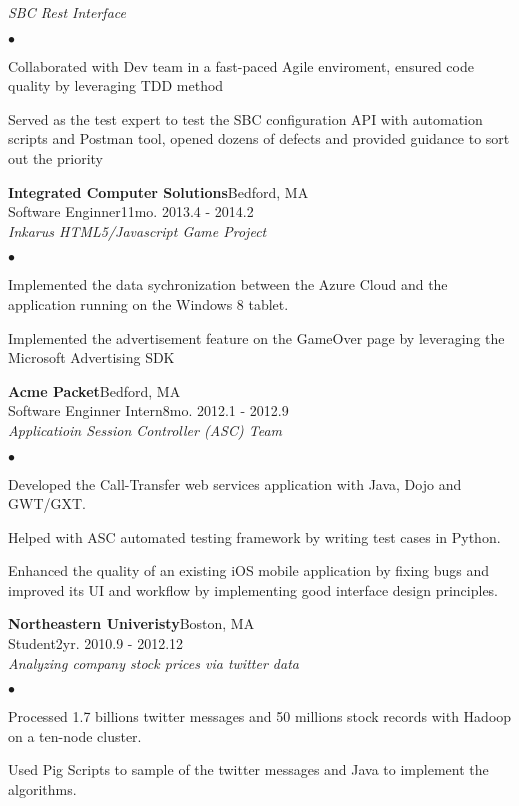 \documentclass[10pt]{article}
\newcommand{\company}[5]{
    \large{\textbf{#1}}\hfill \small{#3}\\
    #2\hfill \small{#4}\small{#5}\\
}
\newcommand{\project}[1]{\checkmark\normalsize{{\emph{#1}}}\\}
\newenvironment{achievements}
    {\begin{list}
        {$\bullet$}{\topsep 0pt \itemsep -1pt}} 
    {\end{list}}
\begin{document}
  \project{SBC Rest Interface}
  \begin{achievements}
\item Collaborated with Dev team in a fast-paced Agile enviroment, ensured code quality by leveraging TDD method
\item Served as the test expert to test the SBC configuration API with automation scripts and Postman tool, opened dozens of defects and provided guidance to sort out the priority
  \end{achievements}

  \company{Integrated Computer Solutions}{Software Enginner}{Bedford, MA}{11mo. }{2013.4 - 2014.2}

    \project{Inkarus HTML5/Javascript Game Project}
  \begin{achievements}
\item Implemented the data sychronization between the Azure Cloud and the application running on the Windows 8 tablet.
\item Implemented the advertisement feature on the GameOver page by leveraging the Microsoft Advertising SDK
  \end{achievements}

\vspace*{10pt}
  \company{Acme Packet}{Software Enginner Intern}{Bedford, MA}{8mo. }{2012.1 - 2012.9}

  \project{Applicatioin Session Controller (ASC) Team}
  \begin{achievements}
\item Developed the Call-Transfer web services application with Java, Dojo and GWT/GXT.
\item Helped with ASC automated testing framework by writing test cases in Python.
\item Enhanced the quality of an existing iOS mobile application by fixing bugs and improved its UI and workflow by implementing good interface design principles.
  \end{achievements}

\vspace*{10pt}
  \company{Northeastern Univeristy}{Student}{Boston, MA}{2yr. }{2010.9 - 2012.12}

  \project{Analyzing company stock prices via twitter data}
  \begin{achievements}
\item Processed 1.7 billions twitter messages and 50 millions stock records with Hadoop on a ten-node cluster.
\item Used Pig Scripts to sample of the twitter messages and Java to implement the algorithms.
  \end{achievements}
\end{document}
